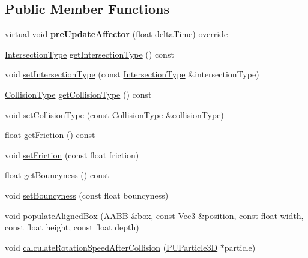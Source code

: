 \subsection*{Public Member Functions}
\begin{DoxyCompactItemize}
\item 
\mbox{\label{classPUBaseCollider_a6eb2a87b9cda2c56c04e178a098468a3}} 
virtual void {\bfseries pre\+Update\+Affector} (float delta\+Time) override
\item 
\hyperlink{classPUBaseCollider_ae86fc81f78c00a88e8e927377a86e81c}{Intersection\+Type} \hyperlink{classPUBaseCollider_ac79e93200966f28399abc3ad8e603f26}{get\+Intersection\+Type} () const
\item 
void \hyperlink{classPUBaseCollider_a1871ec53e7c9932c151007f62572ab8d}{set\+Intersection\+Type} (const \hyperlink{classPUBaseCollider_ae86fc81f78c00a88e8e927377a86e81c}{Intersection\+Type} \&intersection\+Type)
\item 
\hyperlink{classPUBaseCollider_a13f646d7a12d1abb3cca3043c817e726}{Collision\+Type} \hyperlink{classPUBaseCollider_ad56efaa81e830e0173ab4135c62655c2}{get\+Collision\+Type} () const
\item 
void \hyperlink{classPUBaseCollider_a5c29824036f36e8ab3f2553dddb66aa1}{set\+Collision\+Type} (const \hyperlink{classPUBaseCollider_a13f646d7a12d1abb3cca3043c817e726}{Collision\+Type} \&collision\+Type)
\item 
float \hyperlink{classPUBaseCollider_a1a22cdac4632c10d249b8ad681013ac9}{get\+Friction} () const
\item 
void \hyperlink{classPUBaseCollider_a13e2ba264ed65e0c38604bf14981c38c}{set\+Friction} (const float friction)
\item 
float \hyperlink{classPUBaseCollider_a13c2ec2d478b4923cdfe3adad3449c57}{get\+Bouncyness} () const
\item 
void \hyperlink{classPUBaseCollider_a28690e04c5a9733a302f804f64a20520}{set\+Bouncyness} (const float bouncyness)
\item 
void \hyperlink{classPUBaseCollider_a070c2f0ca1a3c55774153b38baec956b}{populate\+Aligned\+Box} (\hyperlink{classAABB}{A\+A\+BB} \&box, const \hyperlink{classVec3}{Vec3} \&position, const float width, const float height, const float depth)
\item 
void \hyperlink{classPUBaseCollider_a96e9b27b4c2d2dac1bd47b7531a4598f}{calculate\+Rotation\+Speed\+After\+Collision} (\hyperlink{structPUParticle3D}{P\+U\+Particle3D} $\ast$particle)

\end{DoxyCompactItemize}
